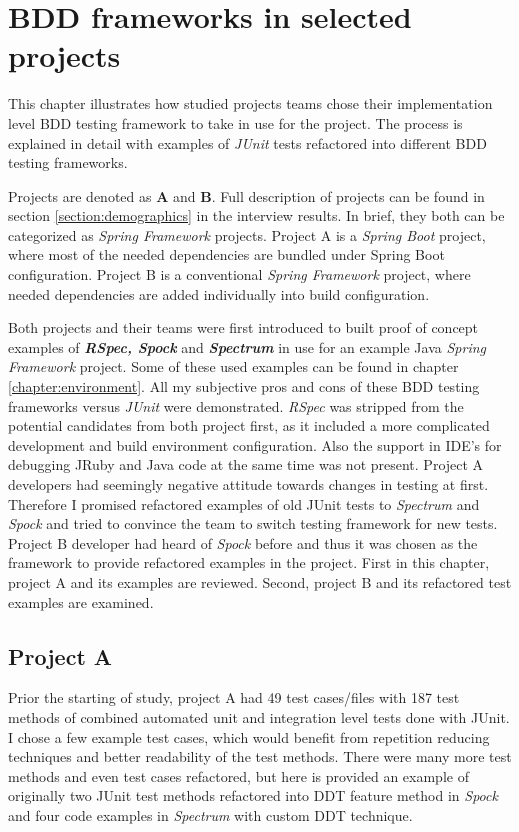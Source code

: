 \chapter{BDD frameworks in selected projects}
\label{chapter:projects}

This chapter illustrates how studied projects teams chose their implementation level BDD testing
framework to take in use for the project. The process is explained in detail with examples of \textit{JUnit} tests
refactored into different BDD testing frameworks.

Projects are denoted as \textbf{A} and \textbf{B}. Full description of projects can be found in section \ref{section:demographics} in the interview
results. In brief, they both can be categorized as \textit{Spring Framework} projects. Project A is a \textit{Spring Boot} project, where
most of the needed dependencies are bundled under Spring Boot configuration. Project B is a conventional \textit{Spring Framework} project,
where needed dependencies are added individually into build configuration.

Both projects and their teams were first introduced to built proof of concept examples of \textbf{\textit{RSpec, Spock}} and \textbf{\textit{Spectrum}}
in use for an example Java \textit{Spring Framework} project. Some of these used examples can be found in chapter \ref{chapter:environment}.
All my subjective pros and cons of these BDD testing frameworks versus \textit{JUnit} were demonstrated. \textit{RSpec} was stripped from the
potential candidates from both project first, as it included a more complicated development and build environment configuration. Also
the support in IDE's for debugging JRuby and Java code at the same time was not present. Project A developers had
seemingly negative attitude towards changes in testing at first. Therefore I promised refactored examples of old JUnit
tests to \textit{Spectrum} and \textit{Spock} and tried to convince the team to switch testing framework for new tests.
Project B developer had heard of \textit{Spock} before and thus it was chosen as the framework to provide refactored examples in the project.
First in this chapter, project A and its examples are reviewed. Second, project B and its refactored test examples are examined.

\label{section:teams}

    \section{Project A}
    Prior the starting of study, project A had 49 test cases/files with 187 test methods of combined automated unit and integration level tests done with JUnit.
    I chose a few example test cases, which would benefit from repetition reducing techniques and better readability of the test methods.
    There were many more test methods and even test cases refactored, but here is provided an example of originally two JUnit
    test methods refactored into DDT feature method in \textit{Spock} and four code examples in \textit{Spectrum} with custom DDT technique.

